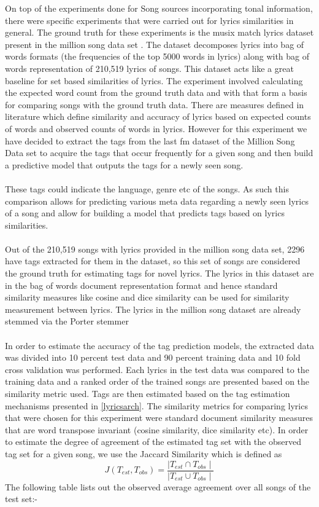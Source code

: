 \noindent On top of the experiments done for Song sources incorporating tonal information, there were specific experiments that were carried out for lyrics similarities in general. The ground truth for these experiments is the musix match lyrics dataset present in the million song data set \cite{msd}. The dataset decomposes lyrics into bag of words formats (the frequencies of the top 5000 words in lyrics) along with bag of words representation of 210,519 lyrics of songs. This dataset acts like a great baseline for set based similarities of lyrics. The experiment involved calculating the expected word count from the ground truth data and with that form a basis for comparing songs with the ground truth data. There are measures defined in literature \cite{lyricsRanking} which define similarity and accuracy of lyrics based on expected counts of words and observed counts of words in lyrics. However for this experiment we have decided to extract the tags from the last fm dataset of the Million Song Data set \cite{msd} to acquire the tags that occur frequently for a given song and then build a predictive model that outputs the tags for a newly seen song. \\\\
These tags could indicate the language, genre etc of the songs. As such this comparison allows for predicting various meta data regarding a newly seen lyrics of a song and allow for building a model that predicts tags based on lyrics similarities. \\\\
Out of the 210,519 songs with lyrics provided in the million song data set, 2296 have tags extracted for them in the dataset, so this set of songs are considered the ground truth for estimating tags for novel lyrics. The lyrics in this dataset are in the bag of words document representation format and hence standard similarity measures like cosine and dice similarity can be used for similarity measurement between lyrics. The lyrics in the million song dataset are already stemmed via the Porter stemmer \cite{msd} \\\\
In order to estimate the accuracy of the tag prediction models, the extracted data was divided into 10 percent test data and 90 percent training data and 10 fold cross validation was performed. Each lyrics in the test data was compared to the training data and a ranked order of the trained songs are presented based on the similarity metric used. Tags are then estimated based on the tag estimation mechanisms presented in \ref{lyricsarch}. The similarity metrics for comparing lyrics that were chosen for this experiment were standard document similarity measures that are word transpose invariant (cosine similarity, dice similarity etc). In order to estimate the degree of agreement of the estimated tag set with the observed tag set for a given song, we use the Jaccard Similarity which is defined as 
\begin{equation}
J(T_{est}, T_{obs}) = \frac{\mid T_{est} \cap T_{obs} \mid}{\mid T_{est} \cup T_{obs} \mid}
\end{equation}
The following table lists out the observed average agreement over all songs of the test set:-

